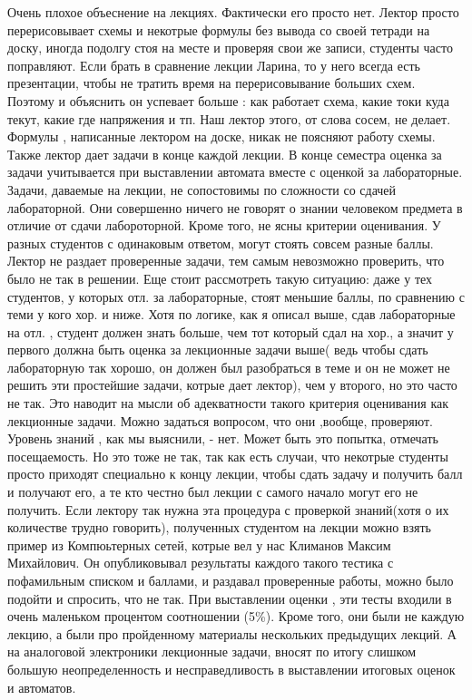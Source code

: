             \begin{commentbox} 
                Очень плохое объеснение на лекциях. Фактически его просто нет.  Лектор просто перерисовывает схемы и некотрые формулы без вывода со своей тетради на доску, иногда подолгу стоя на месте и проверяя свои же записи, студенты часто поправляют.  Если брать в сравнение лекции Ларина, то у него всегда есть презентации, чтобы не тратить время на перерисовывание  больших схем.  Поэтому и объяснить он успевает больше : как работает схема,  какие  токи куда текут, какие где напряжения  и тп. Наш лектор этого, от слова сосем, не делает. Формулы , написанные лектором на доске, никак не поясняют работу схемы.  Также лектор дает задачи  в конце каждой лекции. В конце семестра оценка за задачи учитывается при выставлении автомата вместе с оценкой за лабораторные. Задачи, даваемые на лекции, не сопостовимы по сложности со сдачей лабораторной. Они совершенно ничего не говорят о знании человеком предмета в отличие от сдачи лабороторной. Кроме того, не ясны критерии оценивания. У разных студентов  с одинаковым ответом, могут стоять совсем разные баллы. Лектор не раздает проверенные задачи, тем самым невозможно проверить, что было не так в решении. Еще стоит рассмотреть такую ситуацию:  даже у тех студентов, у которых отл. за лабораторные, стоят меньшие баллы, по сравнению с теми у кого хор. и ниже. Хотя  по логике, как я описал выше, сдав лабораторные на отл. , студент должен знать больше, чем тот который сдал на хор., а значит у  первого должна быть оценка за лекционные задачи выше( ведь чтобы сдать лабораторную так хорошо, он должен был разобраться в теме и он не может не решить эти простейшие задачи, котрые дает лектор), чем у второго, но это часто не так. Это наводит на мысли об адекватности такого критерия оценивания как лекционные задачи. Можно задаться вопросом, что они ,вообще, проверяют.  Уровень знаний , как мы выяснили, - нет. Может быть это попытка, отмечать посещаемость. Но это тоже не так, так как есть случаи, что некотрые студенты просто приходят специально к концу лекции, чтобы сдать задачу и получить балл и получают его, а те кто честно был лекции с самого начало могут его не получить. Если лектору так нужна эта процедура с проверкой знаний(хотя о их количестве трудно говорить), полученных  студентом на лекции можно взять пример из Компюьтерных сетей, котрые вел у нас Климанов Максим Михайлович. Он опубликовывал результаты каждого такого тестика с пофамильным списком и баллами, и раздавал проверенные работы, можно было подойти и спросить, что не так. При выставлении оценки , эти тесты входили в очень маленьком процентом соотношении (5\%). Кроме того, они были не каждую лекцию, а были про пройденному материалы нескольких предыдущих лекций. А на аналоговой электроники лекционные задачи, вносят по итогу слишком большую неопределенность и несправедливость в выставлении итоговых оценок и автоматов. 
            \end{commentbox}

